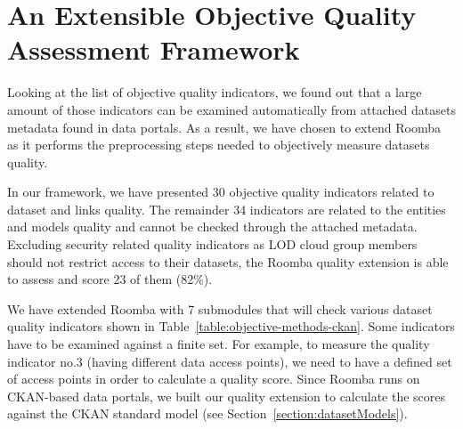 
\section{An Extensible Objective Quality Assessment Framework}
\label{section:quality-assessment-framework}

Looking at the list of objective quality indicators, we found out that a large amount of those indicators can be examined automatically from attached datasets metadata found in data portals. As a result, we have chosen to extend Roomba as it performs the preprocessing steps needed to objectively measure datasets quality.

In our framework, we have presented 30 objective quality indicators related to dataset and links quality. The remainder 34 indicators are related to the entities and models quality and cannot be checked through the attached metadata. Excluding security related quality indicators as LOD cloud group members should not restrict access to their datasets, the Roomba quality extension is able to assess and score 23 of them (82\%).

We have extended Roomba with 7 submodules that will check various dataset quality indicators shown in Table~\ref{table:objective-methods-ckan}. Some indicators have to be examined against a finite set. For example, to measure the quality indicator no.3 (having different data access points), we need to have a defined set of access points in order to calculate a quality score. Since Roomba runs on CKAN-based data portals, we built our quality extension to calculate the scores against the CKAN standard model (see Section~\ref{section:datasetModels}).


